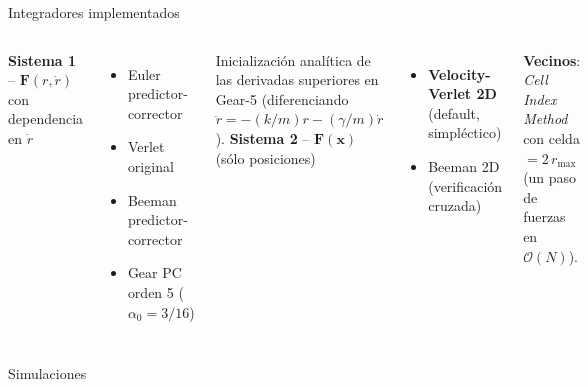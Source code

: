 \documentclass[10pt,aspectratio=169]{beamer}
\newcommand{\vect}[1]{\mathbf{#1}}
\newcommand{\sectiondivider}[1]{%
  \begin{frame}[plain,c]
    \centering
    {\usebeamercolor[fg]{structure}\fontsize{42}{50}\selectfont #1\par}
  \end{frame}%
}
\begin{document}
\begin{frame}{Integradores implementados}
    \begin{columns}[T]
        \textbf{Sistema 1} -- $\vect{F}(r,\dot r)$ con dependencia en $\dot r$
        \begin{itemize}\setlength\itemsep{2pt}
            \item Euler predictor-corrector
            \item Verlet original
            \item Beeman predictor-corrector
            \item Gear PC orden 5 \quad ($\alpha_0 = 3/16$)
        \end{itemize}
        \vspace{0.15cm}
        {\footnotesize Inicialización analítica de las derivadas superiores en Gear-5 (diferenciando $\ddot r = -(k/m)r - (\gamma/m)\dot r$).}
        \textbf{Sistema 2} -- $\vect{F}(\vect{x})$ (sólo posiciones)
        \begin{itemize}\setlength\itemsep{2pt}
            \item \textbf{Velocity-Verlet 2D} (default, simpléctico)
            \item Beeman 2D (verificación cruzada)
        \end{itemize}
        \vspace{0.15cm}
        \textbf{Vecinos}: \emph{Cell Index Method} con celda $= 2\,r_{\max}$ (un paso de fuerzas en $\mathcal{O}(N)$).
    \end{columns}
\end{frame}

\sectiondivider{Simulaciones}
\end{document}

